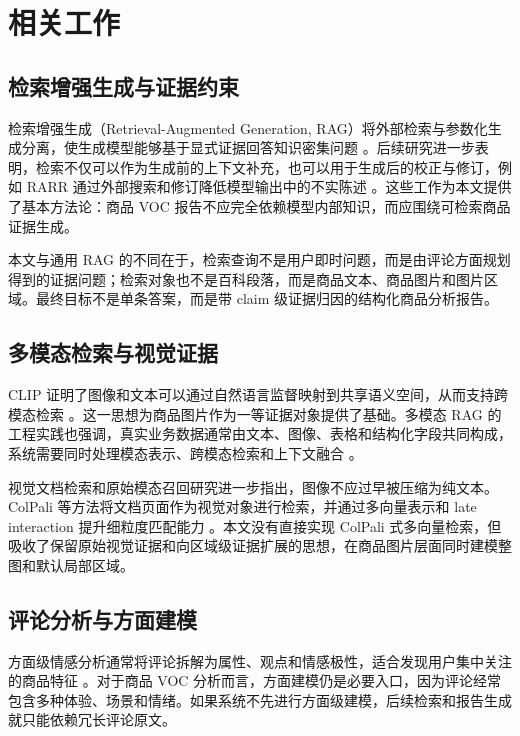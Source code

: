 \documentclass[11pt]{article}
\begin{document}
\section{相关工作}
\subsection{检索增强生成与证据约束}

检索增强生成（Retrieval-Augmented Generation, RAG）将外部检索与参数化生成分离，使生成模型能够基于显式证据回答知识密集问题 \citep{lewis2020retrievalAugmentedGeneration}。后续研究进一步表明，检索不仅可以作为生成前的上下文补充，也可以用于生成后的校正与修订，例如 RARR 通过外部搜索和修订降低模型输出中的不实陈述 \citep{gao2023rarr}。这些工作为本文提供了基本方法论：商品 VOC 报告不应完全依赖模型内部知识，而应围绕可检索商品证据生成。

本文与通用 RAG 的不同在于，检索查询不是用户即时问题，而是由评论方面规划得到的证据问题；检索对象也不是百科段落，而是商品文本、商品图片和图片区域。最终目标不是单条答案，而是带 claim 级证据归因的结构化商品分析报告。

\subsection{多模态检索与视觉证据}

CLIP 证明了图像和文本可以通过自然语言监督映射到共享语义空间，从而支持跨模态检索 \citep{radford2021clip}。这一思想为商品图片作为一等证据对象提供了基础。多模态 RAG 的工程实践也强调，真实业务数据通常由文本、图像、表格和结构化字段共同构成，系统需要同时处理模态表示、跨模态检索和上下文融合 \citep{nvidia2024multimodalRagIntro,nvidia2024aiReadyKnowledgeSystems}。

视觉文档检索和原始模态召回研究进一步指出，图像不应过早被压缩为纯文本。ColPali 等方法将文档页面作为视觉对象进行检索，并通过多向量表示和 late interaction 提升细粒度匹配能力 \citep{faysse2024colpali}。本文没有直接实现 ColPali 式多向量检索，但吸收了保留原始视觉证据和向区域级证据扩展的思想，在商品图片层面同时建模整图和默认局部区域。

\subsection{评论分析与方面建模}

方面级情感分析通常将评论拆解为属性、观点和情感极性，适合发现用户集中关注的商品特征 \citep{pontiki2014semevalAspect}。对于商品 VOC 分析而言，方面建模仍是必要入口，因为评论经常包含多种体验、场景和情绪。如果系统不先进行方面级建模，后续检索和报告生成就只能依赖冗长评论原文。
\end{document}
